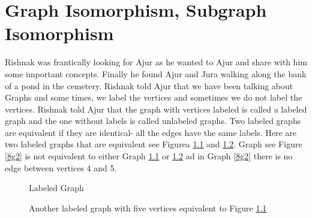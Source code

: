 \chapter{Graph Isomorphism, Subgraph Isomorphism}

Rishnak was frantically looking for Ajur as he wanted to Ajur and share with him some important concepts. Finally he found Ajur and Jura walking along the bank of a pond in the cemetery. Rishnak told Ajur that we have been talking about Graphs and some times, we label the vertices and sometimes we do not label the vertices. Rishnak told Ajur that the graph with vertices labeled is called a labeled graph and the one without labels is called unlabeled graphs. Two labeled graphs are equivalent if they are identical- all the edges have the same labels. Here are two labeled graphs that are equivalent see Figurea \ref{8g1} and \ref{8g11}. Graph see Figure \ref{8g2} is not equivalent to either Graph \ref{8g1} or \ref{8g11} ad in Graph \ref{8g2} there is no edge between vertices 4 and 5.
\begin{figure}
\begin{center}
\caption{Labeled Graph}\label{8g1}
\end{center}

\end{figure}
\begin{figure}
\begin{center}
\caption{ Another labeled graph with five vertices equivalent to Figure \ref{8g1}}\label{8g11}
\end{center}
\end{figure}

